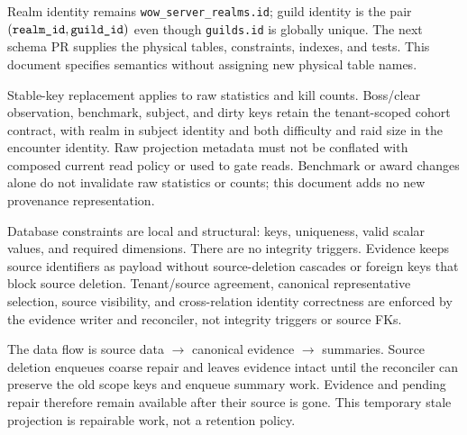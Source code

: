 \documentclass[11pt]{article}
\newcommand{\field}[1]{\texttt{#1}}
\begin{document}
Realm identity remains \field{wow\_\allowbreak server\_\allowbreak realms.\allowbreak id}; guild identity is the pair $(\field{realm\_\allowbreak id},\field{guild\_\allowbreak id})$ even though \field{guilds.\allowbreak id} is globally unique. The next schema PR supplies the physical tables, constraints, indexes, and tests. This document specifies semantics without assigning new physical table names.

Stable-key replacement applies to raw statistics and kill counts. Boss/clear observation, benchmark, subject, and dirty keys retain the tenant-scoped cohort contract, with realm in subject identity and both difficulty and raid size in the encounter identity. Raw projection metadata must not be conflated with composed current read policy or used to gate reads. Benchmark or award changes alone do not invalidate raw statistics or counts; this document adds no new provenance representation.

Database constraints are local and structural: keys, uniqueness, valid scalar values, and required dimensions. There are no integrity triggers. Evidence keeps source identifiers as payload without source-deletion cascades or foreign keys that block source deletion. Tenant/source agreement, canonical representative selection, source visibility, and cross-relation identity correctness are enforced by the evidence writer and reconciler, not integrity triggers or source FKs.

The data flow is source data $\longrightarrow$ canonical evidence $\longrightarrow$ summaries. Source deletion enqueues coarse repair and leaves evidence intact until the reconciler can preserve the old scope keys and enqueue summary work. Evidence and pending repair therefore remain available after their source is gone. This temporary stale projection is repairable work, not a retention policy.
\end{document}
